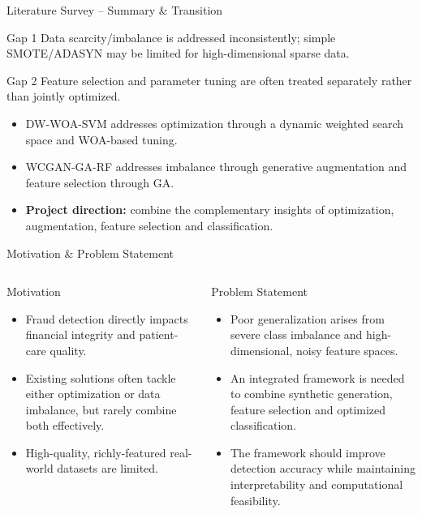 \documentclass[aspectratio=169,11pt]{beamer}
\begin{document}
\begin{frame}{Literature Survey -- Summary \& Transition}
\begin{block}{Gap 1}
Data scarcity/imbalance is addressed inconsistently; simple SMOTE/ADASYN may be limited for high-dimensional sparse data.
\end{block}
\begin{block}{Gap 2}
Feature selection and parameter tuning are often treated separately rather than jointly optimized.
\end{block}
\begin{itemize}
\item DW-WOA-SVM addresses optimization through a dynamic weighted search space and WOA-based tuning.
\item WCGAN-GA-RF addresses imbalance through generative augmentation and feature selection through GA.
\item \textbf{Project direction:} combine the complementary insights of optimization, augmentation, feature selection and classification.
\end{itemize}
\end{frame}

\begin{frame}{Motivation \& Problem Statement}
\begin{columns}[T]
\begin{block}{Motivation}
\begin{itemize}
\item Fraud detection directly impacts financial integrity and patient-care quality.
\item Existing solutions often tackle either optimization or data imbalance, but rarely combine both effectively.
\item High-quality, richly-featured real-world datasets are limited.
\end{itemize}
\end{block}
\begin{block}{Problem Statement}
\begin{itemize}
\item Poor generalization arises from severe class imbalance and high-dimensional, noisy feature spaces.
\item An integrated framework is needed to combine synthetic generation, feature selection and optimized classification.
\item The framework should improve detection accuracy while maintaining interpretability and computational feasibility.
\end{itemize}
\end{block}
\end{columns}
\end{frame}
\end{document}
